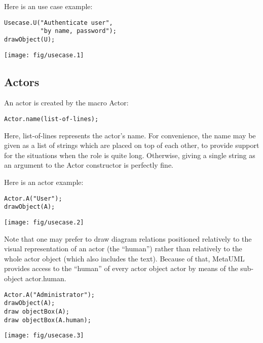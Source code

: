 \documentclass{article}
\newcommand{\code}{\ttfamily}
\begin{document}
Here is an use case example:

\begin{multicols}{2}
\begin{verbatim}
Usecase.U("Authenticate user",
          "by name, password");
drawObject(U);
\end{verbatim}
\columnbreak
\hspace{1cm}\texttt{[image: fig/usecase.1]}
\end{multicols}

\subsection{Actors}

An actor is created by the macro {\code Actor}:

\begin{verbatim}
Actor.name(list-of-lines);
\end{verbatim}

Here, {\code list-of-lines} represents the actor's name. For convenience, the name may be
given as a list of strings which are placed on top of each other, to provide support for
the situations when the role is quite long. Otherwise, giving a single string
as an argument to the Actor constructor is perfectly fine.

Here is an actor example:

\begin{multicols}{2}
\begin{verbatim}
Actor.A("User");
drawObject(A);
\end{verbatim}
\columnbreak
\hspace{1cm}\texttt{[image: fig/usecase.2]}
\end{multicols}

Note that one may prefer to draw diagram relations positioned relatively to
the visual representation of an actor (the ``human'') rather than relatively to the whole
actor object (which also includes the text). Because of that, MetaUML provides access
to the ``human'' of every actor object {\code actor} by means of the sub-object {\code actor.human}.

\begin{multicols}{2}
\begin{verbatim}
Actor.A("Administrator");
drawObject(A);
draw objectBox(A);
draw objectBox(A.human);
\end{verbatim}
\columnbreak
\hspace{1cm}\texttt{[image: fig/usecase.3]}
\end{multicols}
\end{document}
